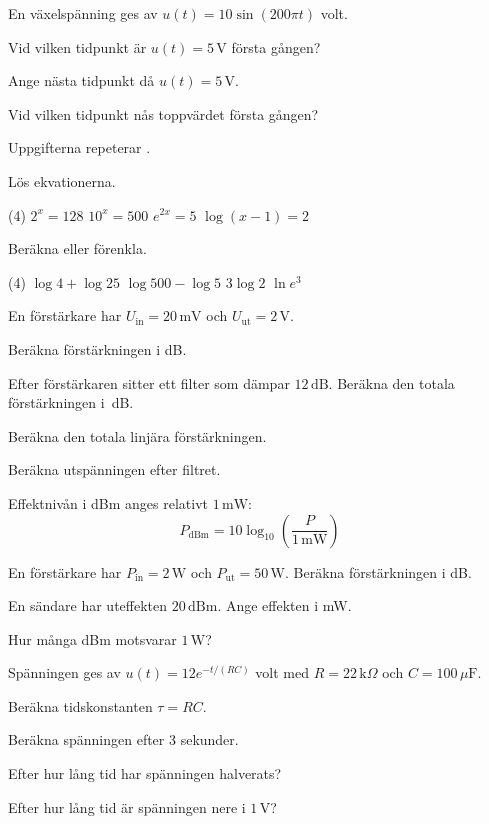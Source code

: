 En växelspänning ges av $u(t) = 10\sin(200\pi t)$ volt.
\begin{parts}
  \item Vid vilken tidpunkt är $u(t) = 5\,\text{V}$ första gången?
  \item Ange nästa tidpunkt då $u(t) = 5\,\text{V}$.
  \item Vid vilken tidpunkt nås toppvärdet första gången?
\end{parts}

Uppgifterna repeterar .

Lös ekvationerna.
\begin{delar}(4)
  \task $2^x = 128$
  \task $10^x = 500$
  \task $e^{2x} = 5$
  \task $\log(x - 1) = 2$
\end{delar}

Beräkna eller förenkla.
\begin{delar}(4)
  \task $\log 4 + \log 25$
  \task $\log 500 - \log 5$
  \task $3\log 2$
  \task $\ln e^3$
\end{delar}

En förstärkare har $U_{\text{in}} = 20\,\text{mV}$ och $U_{\text{ut}} = 2\,\text{V}$.
\begin{parts}
  \item Beräkna förstärkningen i dB.
  \item Efter förstärkaren sitter ett filter som dämpar $12\,\text{dB}$. Beräkna den totala
    förstärkningen i~dB.
  \item Beräkna den totala linjära förstärkningen.
  \item Beräkna utspänningen efter filtret.
\end{parts}

Effektnivån i dBm anges relativt $1\,\text{mW}$:
\[
  P_{\text{dBm}} = 10\log_{10}\left(\frac{P}{1\,\text{mW}}\right)
\]
\begin{parts}
  \item En förstärkare har $P_{\text{in}} = 2\,\text{W}$ och $P_{\text{ut}} = 50\,\text{W}$.
    Beräkna förstärkningen i dB.
  \item En sändare har uteffekten $20\,\text{dBm}$. Ange effekten i mW.
  \item Hur många dBm motsvarar $1\,\text{W}$?
\end{parts}

Spänningen ges av $u(t) = 12e^{-t/(RC)}$ volt med $R = 22\,\text{k}\Omega$ och
$C = 100\,\mu\text{F}$.
\begin{parts}
  \item Beräkna tidskonstanten $\tau = RC$.
  \item Beräkna spänningen efter $3$ sekunder.
  \item Efter hur lång tid har spänningen halverats?
  \item Efter hur lång tid är spänningen nere i $1\,\text{V}$?
\end{parts}
